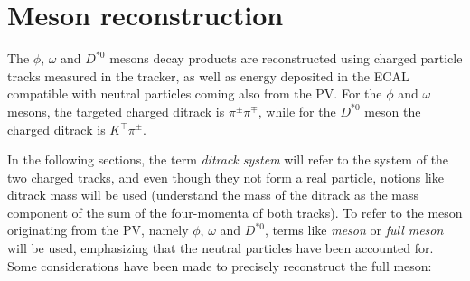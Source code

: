 \section{Meson reconstruction }\label{sec:meson_reconstruction}

The $\phi$, $\omega$ and $D^{*0}$ mesons decay products are reconstructed using charged particle tracks measured in the tracker, as well as energy deposited in the ECAL compatible with neutral particles coming also from the PV. For the $\phi$ and $\omega$ mesons, the targeted charged ditrack is $\pi^\pm\pi^\mp$, while for the $D^{*0}$ meson the charged ditrack is $K^{\mp}\pi^{\pm}$.

In the following sections, the term \textit{ditrack system} will refer to the system of the two charged tracks, and even though they not form a real particle, notions like ditrack mass will be used (understand the mass of the ditrack as the mass component of the sum of the four-momenta of both tracks). To refer to the meson originating from the PV, namely $\phi$, $\omega$ and $D^{*0}$, terms like \textit{meson} or \textit{full meson} will be used, emphasizing that the neutral particles have been accounted for. Some considerations have been made to precisely reconstruct the full meson:
\vspace*{-6pt}
